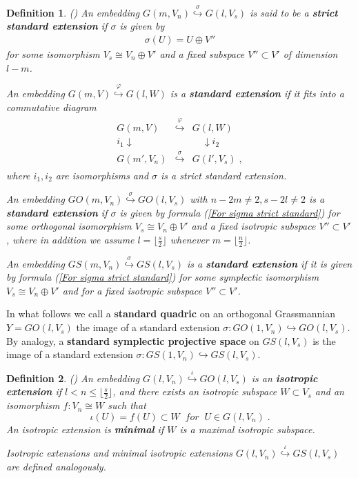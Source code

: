 \documentclass[12pt]{amsart}
\newtheorem{definition}{Definition}[section]
\begin{document}
\begin{definition}\label{Def Standard Extension} {\rm (\cite{Penkov-Tikhomirov-Lin-ind-Grass})}
An embedding $G(m,V_n) \stackrel{\sigma}{\hookrightarrow} G(l,V_s)$ is said to be a {\bf strict standard extension} if $\sigma$ is given by
\begin{gather}\label{For sigma strict standard}
\sigma(U) = U\oplus V''
\end{gather}
for some isomorphism $V_s\cong V_{n}\oplus V'$ and a fixed subspace $V''\subset V'$ of dimension $l-m$.

An embedding $G(m,V) \stackrel{\varphi}{\hookrightarrow} G(l,W)$ is a {\bf standard extension} if it fits into a commutative diagram
\begin{gather*}
\begin{array}{ccc}
G(m,V) & \stackrel{\varphi}{\hookrightarrow} & G(l,W) \\
i_1 \downarrow \qquad & & \quad \downarrow i_2 \\
G(m',V_n) & \stackrel{\sigma}{\hookrightarrow} & G(l',V_s) \;,
\end{array}
\end{gather*}
where $i_1,i_2$ are isomorphisms and $\sigma$ is a strict standard extension.

An embedding $GO(m,V_n) \stackrel{\sigma}{\hookrightarrow} GO(l,V_s)$ with $n-2m\ne 2, s-2l\ne 2$ is a {\bf standard extension} if $\sigma$ is given by formula (\ref{For sigma strict standard}) for some orthogonal isomorphism $V_s\cong V_n\oplus V'$ and a fixed isotropic subspace $V''\subset V'$, where in addition we assume $l=\lfloor\frac{s}{2}\rfloor$ whenever $m=\lfloor\frac{n}{2}\rfloor$.

An embedding $GS(m,V_n) \stackrel{\sigma}{\hookrightarrow} GS(l,V_s)$ is a {\bf standard extension} if it is given by formula (\ref{For sigma strict standard}) for some symplectic isomorphism $V_s\cong V_n\oplus V'$ and for a fixed isotropic subspace $V''\subset V'$.
\end{definition}

In what follows we call a {\bf standard quadric} on an orthogonal Grassmannian $Y=GO(l,V_s)$ the image of a standard extension $\sigma:GO(1,V_n)\hookrightarrow GO(l,V_s)$. By analogy, a {\bf standard symplectic projective space} on $GS(l,V_s)$ is the image of a standard extension $\sigma:GS(1,V_n)\hookrightarrow GS(l,V_s)$.

\begin{definition}\label{Def Isotropic Extension} {\rm (\cite{Penkov-Tikhomirov-Lin-ind-Grass})}
An embedding $G(l,V_n) \stackrel{\iota}{\hookrightarrow} GO(l,V_s)$ is an {\bf isotropic extension} if $l< n\leq \lfloor\frac{s}{2}\rfloor$, and there exists an isotropic subspace $W\subset V_s$ and an isomorphism $f:V_n\cong W$ such that
$$
\iota(U) = f(U) \subset W \;\; for\;\; U\in G(l,V_n)\;.
$$
An isotropic extension is {\bf minimal} if $W$ is a maximal isotropic subspace.

Isotropic extensions and minimal isotropic extensions $G(l,V_n) \stackrel{\iota}{\hookrightarrow} GS(l,V_s)$ are defined analogously.
\end{definition}
\end{document}
